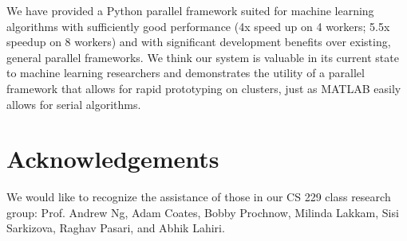\documentclass[%
  final,
  notitlepage,
  narroweqnarray,
  inline,
]{ieee}
\begin{document}
We have provided a Python parallel framework suited for machine learning
algorithms with sufficiently good performance (4x speed up on 4 workers; 5.5x
speedup on 8 workers) and with significant development benefits over existing,
general parallel frameworks.  We think our system is valuable in its current
state to machine learning researchers and demonstrates the utility of a
parallel framework that allows for rapid prototyping on clusters, just as
MATLAB easily allows for serial algorithms.

\section{Acknowledgements}
We would like to recognize the assistance of those in our CS 229 class research
group: Prof. Andrew Ng, Adam Coates, Bobby Prochnow, Milinda Lakkam, Sisi
Sarkizova, Raghav Pasari, and Abhik Lahiri.




\end{document}
